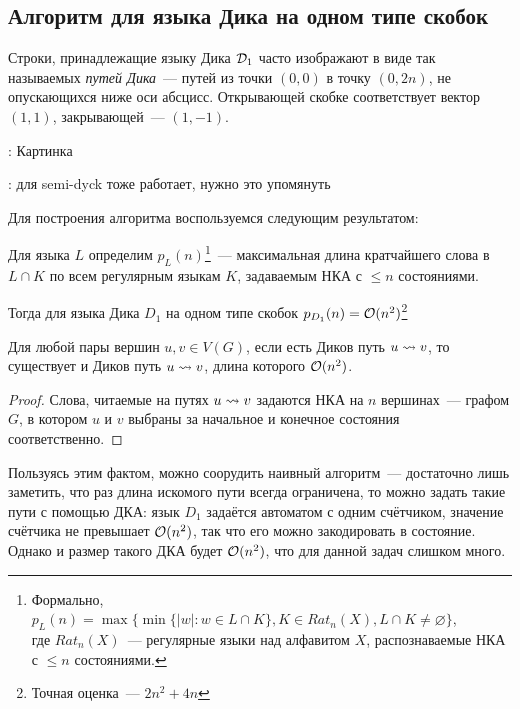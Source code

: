 \subsection{Алгоритм для языка Дика на одном типе скобок}

\begin{note}
  Строки, принадлежащие языку Дика $\mathcal{D}_1$ часто изображают в виде так называемых \textit{путей Дика}~--- путей из точки $(0, 0)$ в точку $(0, 2n)$, не опускающихся ниже оси абсцисс. Открывающей скобке соответствует вектор $(1, 1)$, закрывающей~--- $(1, -1)$.

  \TODO: Картинка 
\end{note}

\TODO: для semi-dyck тоже работает, нужно это упомянуть

Для построения алгоритма воспользуемся следующим результатом:

\begin{lemma}

Для языка $L$ определим $p_L(n)$\footnote{Формально, $p_L(n) = \max \{ \min \{|w| \colon w \in L \cap K \}, K \in Rat_n(X), L \cap K \ne \varnothing \}$,\\ где $Rat_n(X)$~--- регулярные языки над алфавитом $X$, распознаваемые НКА с $\le n$ состояниями.}~--- максимальная длина кратчайшего слова в $L \cap K$ по всем регулярным языкам $K$, задаваемым НКА с $\le n$ состояниями.

Тогда для языка Дика $D_1$ на одном типе скобок $p_{D_1}(n) = \mathcal{O}(n^2)$\footnote{Точная оценка~--- $2n^2 + 4n$}
\end{lemma}

\begin{corollary}
    Для любой пары вершин $u, v \in V(G)$, если есть Диков путь $u \rightsquigarrow v$, то существует и Диков путь $u \rightsquigarrow v$, длина которого $\mathcal{O}(n^2)$.
\end{corollary}
\begin{proof}
    Слова, читаемые на путях $u \rightsquigarrow v$ задаются НКА на $n$ вершинах~--- графом $G$, в котором $u$ и $v$ выбраны за начальное и конечное состояния соответственно.
\end{proof}

\begin{note}
Пользуясь этим фактом, можно соорудить наивный алгоритм~--- достаточно лишь заметить, что раз длина искомого пути всегда ограничена, то можно задать такие пути с помощью ДКА: язык $D_1$ задаётся автоматом с одним счётчиком, значение счётчика не превышает $\mathcal{O}(n^2)$, так что его можно закодировать в состояние. Однако и размер такого ДКА будет $\mathcal{O}(n^2)$, что для данной задач слишком много.
\end{note} 

